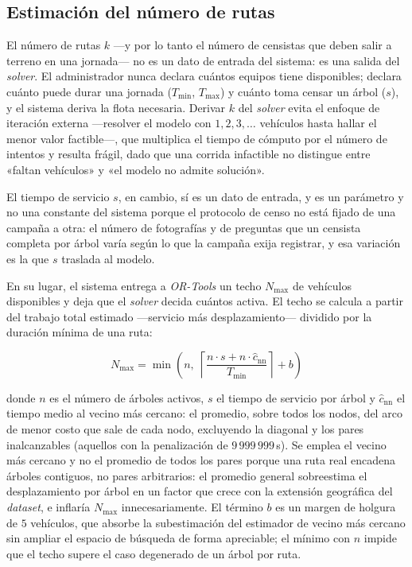\subsection{Estimación del número de rutas}

\label{sec:flota}

El número de rutas $k$ ---y por lo tanto el número de censistas que deben salir a terreno en una
jornada--- no es un dato de entrada del sistema: es una salida del \textit{solver}. El administrador
nunca declara cuántos equipos tiene disponibles; declara cuánto puede durar una jornada ($T_{\min}$,
$T_{\max}$) y cuánto toma censar un árbol ($s$), y el sistema deriva la flota necesaria. Derivar $k$
del \textit{solver} evita el enfoque de iteración externa ---resolver el modelo con
$1, 2, 3, \ldots$ vehículos hasta hallar el menor valor factible---, que multiplica el tiempo de
cómputo por el número de intentos y resulta frágil, dado que una corrida infactible no distingue
entre «faltan vehículos» y «el modelo no admite solución».

El tiempo de servicio $s$, en cambio, sí es un dato de entrada, y es un parámetro y no una constante
del sistema porque el protocolo de censo no está fijado de una campaña a otra: el número de
fotografías y de preguntas que un censista completa por árbol varía según lo que la campaña exija
registrar, y esa variación es la que $s$ traslada al modelo.

En su lugar, el sistema entrega a \textit{OR-Tools} un techo $N_{\max}$ de vehículos disponibles y
deja que el \textit{solver} decida cuántos activa. El techo se calcula a partir del trabajo total
estimado ---servicio más desplazamiento--- dividido por la duración mínima de una ruta:

\begin{equation}
  N_{\max} = \min\!\left(n,\;
  \left\lceil \frac{n \cdot s + n \cdot \hat{c}_{\text{nn}}}{T_{\min}} \right\rceil + b
  \right)
  \label{eq:nmax}
\end{equation}

donde $n$ es el número de árboles activos, $s$ el tiempo de servicio por árbol y
$\hat{c}_{\text{nn}}$ el tiempo medio al vecino más cercano: el promedio, sobre todos los nodos, del
arco de menor costo que sale de cada nodo, excluyendo la diagonal y los pares inalcanzables
(aquellos con la penalización de $9\,999\,999$\,s). Se emplea el vecino más cercano y no el promedio
de todos los pares porque una ruta real encadena árboles contiguos, no pares arbitrarios: el
promedio general sobreestima el desplazamiento por árbol en un factor que crece con la extensión
geográfica del \textit{dataset}, e inflaría $N_{\max}$ innecesariamente. El término $b$ es un margen
de holgura de $5$ vehículos, que absorbe la subestimación del estimador de vecino más cercano sin
ampliar el espacio de búsqueda de forma apreciable; el mínimo
con $n$ impide que el techo supere el caso degenerado de un árbol por ruta.

